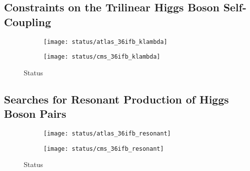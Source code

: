\subsection{Constraints on the Trilinear Higgs Boson Self-Coupling}

\begin{figure}[htbp]
  \centering

  \begin{subfigure}[b]{0.48\textwidth}
    \centering

    \texttt{[image: status/atlas\_36ifb\_klambda]}

  \end{subfigure}\hfill%
  \begin{subfigure}[b]{0.48\textwidth}
    \centering

    \texttt{[image: status/cms\_36ifb\_klambda]}

  \end{subfigure}

  \caption{Status}%
  \label{fig:prior_status_klambda}
\end{figure}


\subsection{Searches for Resonant Production of Higgs Boson Pairs}


\begin{figure}[htbp]
  \centering

  \begin{subfigure}[b]{0.40\textwidth}
    \centering

    \texttt{[image: status/atlas\_36ifb\_resonant]}

  \end{subfigure}\hfill%
  \begin{subfigure}[b]{0.56\textwidth}
    \centering

    \texttt{[image: status/cms\_36ifb\_resonant]}

  \end{subfigure}

  \caption{Status}%
  \label{fig:prior_status_reso}
\end{figure}


